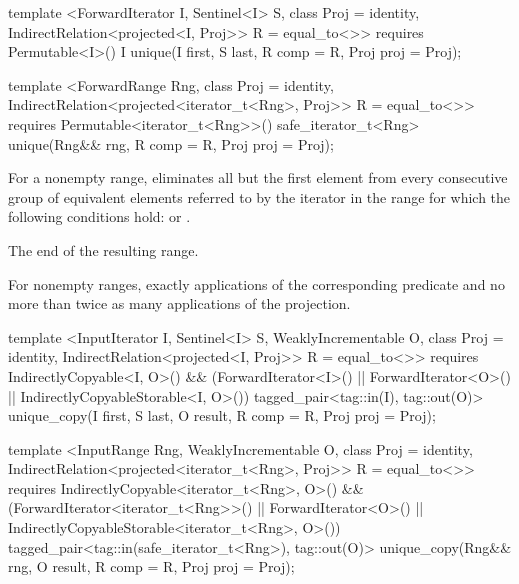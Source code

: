 %
\begin{itemdecl}
template <ForwardIterator I, Sentinel<I> S, class Proj = identity,
    IndirectRelation<projected<I, Proj>> R = equal_to<>>
  requires Permutable<I>()
  I unique(I first, S last, R comp = R{}, Proj proj = Proj{});

template <ForwardRange Rng, class Proj = identity,
    IndirectRelation<projected<iterator_t<Rng>, Proj>> R = equal_to<>>
  requires Permutable<iterator_t<Rng>>()
  safe_iterator_t<Rng>
    unique(Rng&& rng, R comp = R{}, Proj proj = Proj{});
\end{itemdecl}

\begin{itemdescr}
\pnum
\effects
For a nonempty range, eliminates all but the first element from every
consecutive group of equivalent elements referred to by the iterator
in the range
for which the following conditions hold:
or
.

\pnum
\returns
The end of the resulting range.

\pnum
\complexity
For nonempty ranges, exactly
applications of the corresponding predicate and no more than twice as many
applications of the projection.
\end{itemdescr}

%
\begin{itemdecl}
template <InputIterator I, Sentinel<I> S, WeaklyIncrementable O,
    class Proj = identity, IndirectRelation<projected<I, Proj>> R = equal_to<>>
  requires IndirectlyCopyable<I, O>() && (ForwardIterator<I>() ||
    ForwardIterator<O>() || IndirectlyCopyableStorable<I, O>())
  tagged_pair<tag::in(I), tag::out(O)>
    unique_copy(I first, S last, O result, R comp = R{}, Proj proj = Proj{});

template <InputRange Rng, WeaklyIncrementable O, class Proj = identity,
    IndirectRelation<projected<iterator_t<Rng>, Proj>> R = equal_to<>>
  requires IndirectlyCopyable<iterator_t<Rng>, O>() &&
    (ForwardIterator<iterator_t<Rng>>() || ForwardIterator<O>() ||
     IndirectlyCopyableStorable<iterator_t<Rng>, O>())
  tagged_pair<tag::in(safe_iterator_t<Rng>), tag::out(O)>
    unique_copy(Rng&& rng, O result, R comp = R{}, Proj proj = Proj{});
\end{itemdecl}

